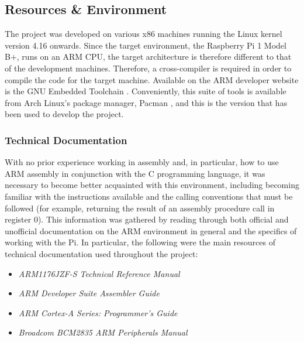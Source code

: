 \subsection{Resources \& Environment}
    The project was developed on various x86 machines running the Linux kernel
    version 4.16 onwards. Since the target environment, the Raspberry Pi 1 Model
    B+, runs on an ARM CPU, the target architecture is therefore different to
    that of the development machines. Therefore, a cross-compiler is required in
    order to compile the code for the target machine. Available on the ARM
    developer website is the GNU Embedded Toolchain \cite{GNUToolchain}.
    Conveniently, this suite of tools is available from Arch Linux's package
    manager, Pacman \cite{PacmanEABI}, and this is the version that has been
    used to develop the project.

    \subsubsection{Technical Documentation}
        With no prior experience working in assembly and, in particular, how to
        use ARM assembly in conjunction with the C programming language, it was
        necessary to become better acquainted with this environment, including
        becoming familiar with the instructions available and the calling
        conventions that must be followed (for example, returning the result of
        an assembly procedure call in register 0). This information was gathered
        by reading through both official and unofficial documentation on the ARM
        environment in general and the specifics of working with the Pi. In
        particular, the following were the main resources of technical
        documentation used throughout the project:
        \begin{itemize}
            \itemsep0em 
            \item \textit{ARM1176JZF-S Technical Reference Manual} \cite{TRM}
            \item \textit{ARM Developer Suite Assembler Guide}
                \cite{OnlineARMGuide}
            \item \textit{ARM Cortex-A Series: Programmer's Guide}
                \cite{ProgrammersGuide}
            \item \textit{Broadcom BCM2835 ARM Peripherals Manual} \cite{BCM2835}
        \end{itemize}

